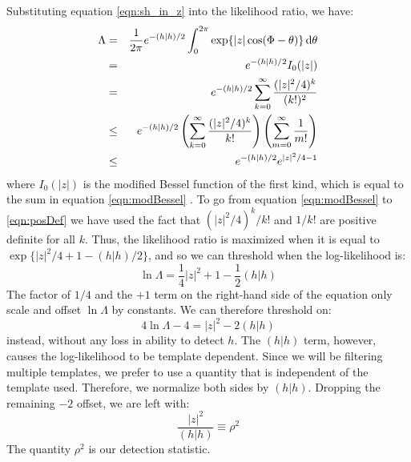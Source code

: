 Substituting equation \ref{eqn:sh_in_z} into the likelihood ratio, we have:
\begin{eqnarray}
\Lambda & = & \frac{1}{2\pi} e^{-(h|h)/2} \int_0^{2\pi} \exp\{ |z|\cos(\Phi - \theta) \} \d \theta \nonumber \\
 & = & e^{-(h|h)/2} I_0(|z|) \nonumber \\
\label{eqn:modBessel}
 & = & e^{-(h|h)/2} \sum_{k=0}^{\infty} \frac{(|z|^{2}/4)^{k}}{(k!)^2} \\
 \label{eqn:posDef}
 & \leq & e^{-(h|h)/2} \left( \sum_{k=0}^{\infty} \frac{ (|z|^{2}/4)^k }{k!} \right) \left(\sum_{m=0}^{\infty} \frac{1}{m!}\right) \\
 & \leq & e^{-(h|h)/2} e^{|z|^{2}/4 - 1}
\end{eqnarray}
where $I_0(|z|)$ is the modified Bessel function of the first kind, which is equal to the sum in equation \ref{eqn:modBessel} \cite{Weisstein:ModBessel:Wolfram}. To go from equation \ref{eqn:modBessel} to \ref{eqn:posDef} we have used the fact that $(|z|^{2}/4)^{k}/k!$ and $1/k!$ are positive definite for all $k$. Thus, the likelihood ratio is maximized when it is equal to $\exp\{ |z|^2/4 + 1 - (h|h)/2 \}$, and so we can threshold when the log-likelihood is:
\begin{equation}
\ln \Lambda = \frac{1}{4}|z|^2 + 1 - \frac{1}{2}(h|h)
\end{equation}
The factor of $1/4$ and the $+1$ term on the right-hand side of the equation only scale and offset $\ln\Lambda$ by constants. We can therefore threshold on:
\begin{equation}
4 \ln \Lambda - 4 = |z|^2 - 2(h|h)
\end{equation}
instead, without any loss in ability to detect $h$. The $(h|h)$ term, however, causes the log-likelihood to be template dependent. Since we will be filtering multiple templates, we prefer to use a quantity that is independent of the template used. Therefore, we normalize both sides by $(h|h)$. Dropping the remaining $-2$ offset, we are left with:
\begin{equation}
\frac{|z|^2}{(h|h)} \equiv \rho^{2}
\end{equation}
The quantity $\rho^2$ is our detection statistic.

